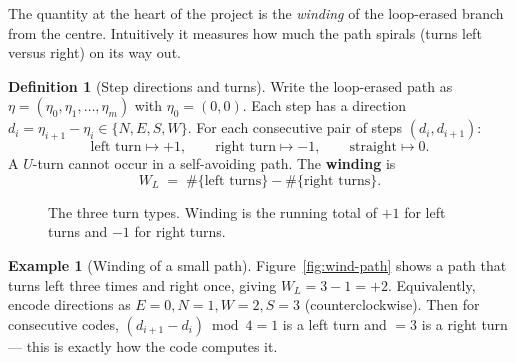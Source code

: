 \documentclass[11pt]{article}
\theoremstyle{definition}
\newtheorem{definition}{Definition}[section]
\newtheorem{example}{Example}[section]
\theoremstyle{plain}
\newcommand{\Wind}{W_{L}}
\begin{document}
The quantity at the heart of the project is the \emph{winding} of the
loop-erased branch from the centre. Intuitively it measures how much the path
spirals (turns left versus right) on its way out.

\begin{definition}[Step directions and turns]
Write the loop-erased path as $\eta=(\eta_0,\eta_1,\dots,\eta_m)$ with
$\eta_0=(0,0)$. Each step has a direction $d_i=\eta_{i+1}-\eta_i\in\{N,E,S,W\}$.
For each consecutive pair of steps $(d_i,d_{i+1})$:
\[
  \text{left turn} \mapsto +1,\qquad
  \text{right turn}\mapsto -1,\qquad
  \text{straight}  \mapsto 0 .
\]
A $U$-turn cannot occur in a self-avoiding path. The \textbf{winding} is
\[
   \Wind \;=\; \#\{\text{left turns}\}-\#\{\text{right turns}\}.
\]
\end{definition}

\begin{figure}[h]
\centering
{}
\caption{The three turn types. Winding is the running total of $+1$ for left
turns and $-1$ for right turns.}
\label{fig:turns}
\end{figure}

\begin{example}[Winding of a small path]
Figure~\ref{fig:wind-path} shows a path that turns left three times and right
once, giving $\Wind=3-1=+2$. Equivalently, encode directions as
$E=0,N=1,W=2,S=3$ (counterclockwise). Then for consecutive codes,
$(d_{i+1}-d_i)\bmod 4 = 1$ is a left turn and $=3$ is a right turn --- this is
exactly how the code computes it.
\end{example}
\end{document}
